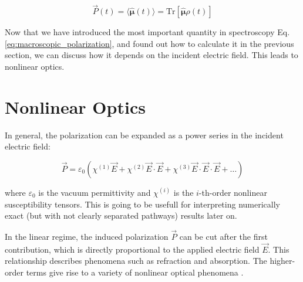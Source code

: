 \begin{equation}
	\vec{P}(t) = \langle \mathbf{\hat{\mu}}(t) \rangle = \mathrm{Tr}[\mathbf{\hat{\mu}} \rho(t)]
	\label{eq:polarization_expectation_value}
\end{equation}


\noindent
Now that we have introduced the most important quantity in spectroscopy Eq. \ref{eq:macroscopic_polarization}, and found out how to calculate it in the previous section, we can discuss how it depends on the incident electric field. This leads to nonlinear optics.

\section{Nonlinear Optics}
\label{sec:nonlinear_optics}


In general, the polarization can be expanded as a power series in the incident electric field:

\begin{equation}
	\vec{P} = \varepsilon_0 (\chi^{(1)} \vec{E} + \chi^{(2)} \vec{E} \cdot \vec{E} + \chi^{(3)} \vec{E} \cdot \vec{E} \cdot \vec{E} + \ldots)
	\label{eq:nonlinear_polarization}
\end{equation}

\noindent 
where $\varepsilon_0$ is the vacuum permittivity and $\chi^{(i)}$ is the $i$-th-order nonlinear susceptibility tensors.  This is going to be usefull for interpreting numerically exact (but with not clearly separated pathways) results later on.

\noindent 
In the linear regime, the induced polarization $\vec{P}$ can be cut after the first contribution, which is directly proportional to the applied electric field $\vec{E}$.
This relationship describes phenomena such as refraction and absorption.
The higher-order terms give rise to a variety of nonlinear optical phenomena \cite{boyd2008contents}.

